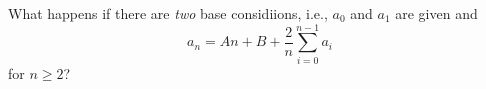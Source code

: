 What happens if there are \textit{two} base considiions, i.e.,
$a_0$ and $a_1$ are given and
\[
a_n = An + B + \frac{2}{n} \sum_{i=0}^{n-1} a_i
\]
for $n \geq 2$?
